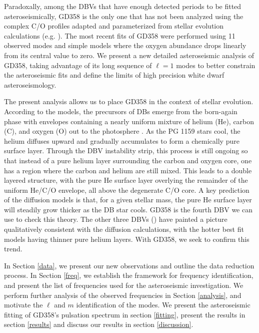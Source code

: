 \documentclass[12pt,preprint]{aastex}
\begin{document}
Paradoxally, among the DBVs that have enough detected periods to be fitted 
asteroseismically, GD358 is the only one that has not been analyzed using the complex 
C/O profiles adapted and parameterized from stellar evolution calculations
(e.g. {}\citet{Salaris97,Althaus05}). The most recent fits of GD358 \citep{Metcalfe03c} were 
performed using 11 observed modes and simple models where the oxygen abundance 
drops linearly from its central value to zero. We present a new detailed asteroseismic analysis of GD358, taking advantage of 
its long sequence of $\ell=1$ modes to better constrain the asteroseismic fits and 
define the limits of high precision white dwarf asteroseismology.  

The present analysis allows us to place GD358 in the context of stellar evolution. 
According to the models, the precursors of DBs emerge from the born-again phase with 
envelopes containing a nearly uniform mixture of helium (He), carbon (C), and oxygen (O) 
out to the photosphere \citep{Dreizler98,Herwig99}. As the PG 1159 stars cool, the helium 
diffuses upward and gradually accumulates to form a chemically pure surface layer. Through 
the DBV instability strip, this process is still ongoing so that instead of a pure helium 
layer surrounding the carbon and oxygen core, one has a region where the carbon and helium 
are still mixed. This leads to a double layered structure, with the pure He surface layer 
overlying the remainder of the uniform He/C/O envelope, all above the degenerate C/O core. 
A key prediction of the diffusion models is that, for a given stellar mass, the pure He 
surface layer will steadily grow thicker as the DB star cools.  GD358 is the fourth DBV 
we can use to check this theory. The other three DBVs 
(\citet{Bischoff-Kim14,Sullivan08, Metcalfe03c}) have painted a picture qualitatively consistent with 
the diffusion calculations, with the hotter best fit models having thinner pure helium 
layers. With GD358, we seek to confirm this trend.

In Section \ref{data}, we present our new observations and outline the data reduction process.  
In Section \ref{freq}, we establish the framework for frequency identification, and present the 
list of frequencies used for the asteroseismic investigation. We perform further analysis of the observed frequencies in Section \ref{analysis}, and motivate the $\ell$ and $m$ identification of the modes. We present the asteroseismic fitting of GD358's pulsation spectrum in section \ref{fitting}, present the results in section \ref{results} and discuss our results in section \ref{discussion}.
\end{document}
